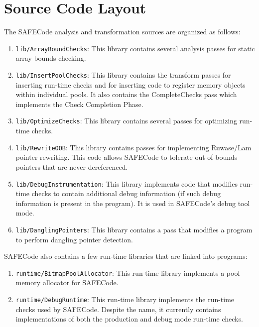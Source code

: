 \section{Source Code Layout}
\label{section:layout}

The SAFECode analysis and transformation sources are organized as follows:

\begin{enumerate}
\item{{\tt lib/ArrayBoundChecks}:}
This library contains several analysis passes for static array bounds
checking.

\item{{\tt lib/InsertPoolChecks}:}
This library contains the transform passes for inserting run-time
checks and for inserting code to register memory objects within
individual pools.  It also contains the CompleteChecks pass which
implements the Check Completion Phase.

\item{{\tt lib/OptimizeChecks}:}
This library contains several passes for optimizing run-time checks.

\item{{\tt lib/RewriteOOB}:}
This library contains passes for implementing Ruwase/Lam pointer
rewriting.  This code allows SAFECode to tolerate out-of-bounds pointers
that are never dereferenced.

\item{{\tt lib/DebugInstrumentation}:}
This library implements code that modifies run-time checks to contain
additional debug information (if such debug information is present in the
program).  It is used in SAFECode's debug tool mode.

\item{{\tt lib/DanglingPointers}:}
This library contains a pass that modifies a program to perform
dangling pointer detection.
\end{enumerate}

SAFECode also contains a few run-time libraries that are linked into
programs:

\begin{enumerate}
\item{{\tt runtime/BitmapPoolAllocator}:}
This run-time library implements a pool memory allocator for SAFECode.

\item{{\tt runtime/DebugRuntime}:}
This run-time library implements the run-time checks used by SAFECode.
Despite the name, it currently contains implementations of both the
production and debug mode run-time checks.
\end{enumerate}
